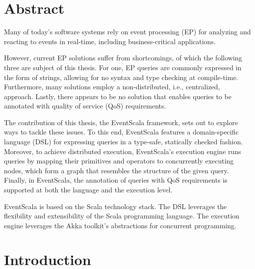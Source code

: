 \documentclass[article, 10pt, type=bsc, colorback, accentcolor=tud8b, parskip=half, bibliography=totocnumbered]{tudthesis}
\begin{document}
\author{Lucas Konstantin Bärenfänger}

\makethesistitle


\tableofcontents

\newpage

\section{Abstract}
\label{sec:abstract}

Many of today's software systems rely on event processing (EP) for analyzing and reacting to events in real-time, including business-critical applications.

However, current EP solutions suffer from shortcomings, of which the following three are subject of this thesis.
For one, EP queries are commonly expressed in the form of strings, allowing for no syntax and type checking at compile-time.
Furthermore, many solutions employ a non-distributed, i.e., centralized, approach.
Lastly, there appears to be no solution that enables queries to be annotated with quality of service (QoS) requirements.

The contribution of this thesis, the EventScala framework, sets out to explore ways to tackle these issues.
To this end, EventScala features a domain-specific language (DSL) for expressing queries in a type-safe, statically checked fashion.
Moreover, to achieve distributed execution, EventScala's execution engine runs queries by mapping their primitives and operators to concurrently executing nodes, which form a graph that resembles the structure of the given query.
Finally, in EventScala, the annotation of queries with QoS requirements is supported at both the language and the execution level.

EventScala is based on the Scala technology stack.
The DSL leverages the flexibility and extensibility of the Scala programming language.
The execution engine leverages the Akka toolkit's abstractions for concurrent programming.

\newpage

\section{Introduction}
\label{sec:introduction}
\end{document}
